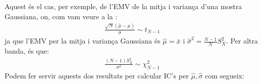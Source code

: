\documentclass[letterpaper,10pt,english]{sphinxmanual}
\begin{document}
Aquest és el cas, per exemple, de l’EMV de la mitja i variança d’una mostra Gaussiana,
on, com vam veure a la :
\begin{equation*}
\begin{split}\frac{\sqrt{N}(\hat{\mu} - \mu)}{\hat{\sigma}} \sim t_{N-1}\end{split}
\end{equation*}
ja que l’EMV per la mitja i variança Gaussiana és
\(\hat{\mu}=\bar{x}\) i \(\hat{\sigma}^2 = \frac{N-1}{N}S_X^2\).
Per altra banda,  és que:
\begin{equation*}
\begin{split}\frac{(N-1)S_X^2}{\sigma^2} \sim \chi_{N-1}^2\end{split}
\end{equation*}
Podem fer servir aquests dos resultats per
calcular IC’s per \(\hat{\mu}, \hat{\sigma}\) com segueix:
\end{document}
